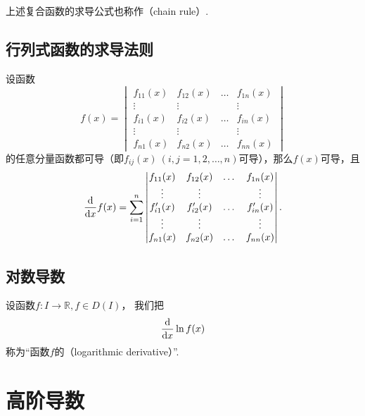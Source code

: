 上述复合函数的求导公式也称作（chain rule）.

\subsection{行列式函数的求导法则}
\begin{theorem}
\def\f#1{f_{#1}(x)}%
\def\g#1{f_{#1}'(x)}%
设函数\[
f(x) = \begin{vmatrix}
\f{11} & \f{12} & \dots & \f{1n} \\
\vdots & \vdots & & \vdots \\
\f{i1} & \f{i2} & \dots & \f{in} \\
\vdots & \vdots & & \vdots \\
\f{n1} & \f{n2} & \dots & \f{nn}
\end{vmatrix}
\]的任意分量函数都可导（即\(\f{ij}\ (i,j=1,2,\dotsc,n)\)可导），那么\(f(x)\)可导，且\[
\dv{x} f(x) = \sum_{i=1}^n \begin{vmatrix}
\f{11} & \f{12} & \dots & \f{1n} \\
\vdots & \vdots & & \vdots \\
\g{i1} & \g{i2} & \dots & \g{in} \\
\vdots & \vdots & & \vdots \\
\f{n1} & \f{n2} & \dots & \f{nn}
\end{vmatrix}.
\]
\end{theorem}

\subsection{对数导数}
\begin{definition}
设函数\(f\colon I \to \mathbb{R}, f \in D(I)\)，
我们把\[
	\dv{x} \ln f(x)
\]称为“函数\(f\)的（logarithmic derivative）”.
\end{definition}

\section{高阶导数}
